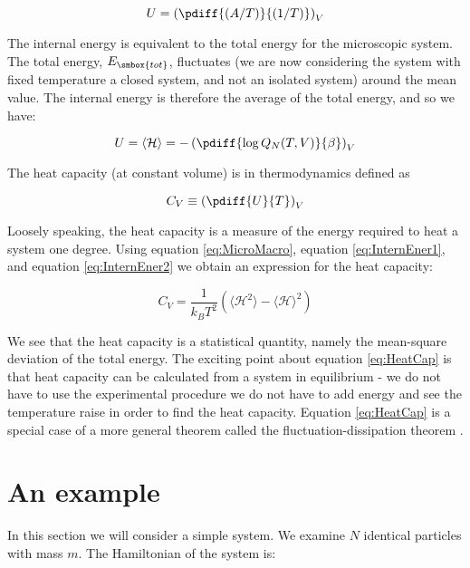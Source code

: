\begin{equation}
\label{eq:InternEner1}
  U = \left( \pdiff{(A/T)}{(1/T)} \right)_V
\end{equation}

The internal energy is equivalent to the total energy for the
microscopic system. The total energy, $E_{\smbox{tot}}$, fluctuates
(we are now considering the system with fixed temperature \ie a closed
system, and not an isolated system) around the mean value. The internal
energy is therefore the average of the total energy, and so we have:

\begin{equation}
\label{eq:InternEner2}
  U = \langle \mathcal{H} \rangle = -\left(\pdiff{\log Q_N(T, V)}{\beta}
  \right)_V
\end{equation}

The heat capacity (at constant volume) is in thermodynamics defined as

\begin{equation}
  C_V \equiv \left( \pdiff{U}{T} \right)_V
\end{equation}

Loosely speaking, the heat capacity is a measure of the energy
required to heat a system one degree. Using equation \eqref{eq:MicroMacro},
equation \eqref{eq:InternEner1}, and equation \eqref{eq:InternEner2} we obtain
an expression for the heat capacity:

\begin{equation}
\label{eq:HeatCap}
  C_V = \frac{1}{k_B T^2} \left( \langle\mathcal{H}^2\rangle -
    \langle\mathcal{H}\rangle^2 \right)
\end{equation}

We see that the heat capacity is a statistical quantity, namely the
mean-square deviation of the total energy. The exciting point about equation
\eqref{eq:HeatCap} is that heat capacity can be calculated from a
system in equilibrium -
we do not have to use the experimental procedure \ie we do not have to
add energy and see the temperature raise in order to find the
heat capacity. Equation \eqref{eq:HeatCap} is a special case of a more
general theorem called the fluctuation-dissipation theorem
\cite{Huang87}.


\section{An example}
\label{sect:IdealGas}
In this section we will consider a simple system. We examine $N$
identical particles with mass $m$. The Hamiltonian of the system is:

